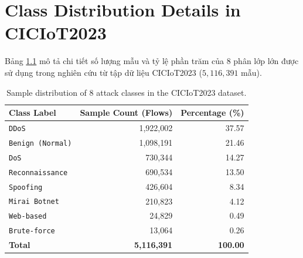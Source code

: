 \chapter{Class Distribution Details in CICIoT2023}
\label{app:label_dist}
Bảng \ref{tab:ciciot_distribution} mô tả chi tiết số lượng mẫu và tỷ lệ phần trăm của 8 phân lớp lớn được sử dụng trong nghiên cứu từ tập dữ liệu CICIoT2023 ($5,116,391$ mẫu).

\begin{table}[H]
\centering
\caption{Sample distribution of 8 attack classes in the CICIoT2023 dataset.}
\label{tab:ciciot_distribution}
\begin{tabular}{l r r}
\toprule
\textbf{Class Label} & \textbf{Sample Count (Flows)} & \textbf{Percentage (\%)} \\
\midrule
\texttt{DDoS} & 1,922,002 & 37.57 \\
\texttt{Benign (Normal)} & 1,098,191 & 21.46 \\
\texttt{DoS} & 730,344 & 14.27 \\
\texttt{Reconnaissance} & 690,534 & 13.50 \\
\texttt{Spoofing} & 426,604 & 8.34 \\
\texttt{Mirai Botnet} & 210,823 & 4.12 \\
\texttt{Web-based} & 24,829 & 0.49 \\
\texttt{Brute-force} & 13,064 & 0.26 \\
\midrule
\textbf{Total} & \textbf{5,116,391} & \textbf{100.00} \\
\bottomrule
\end{tabular}
\end{table}
